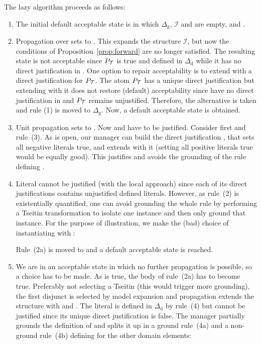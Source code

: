\documentclass[11pt]{article}
\newcommand{\m}[1]{\ensuremath{#1}\xspace}
\newcommand{\I}{\m{\mathcal{I}}}
\newcommand{\theory}{\m{\mathcal{T}}}
\newcommand{\D}{\m{\Delta}}
\theoremstyle{plain}
\theoremstyle{definition}
\theoremstyle{example_basic}
\theoremstyle{example_contd}
\theoremstyle{plain}
\newcommand{\Dg}{\ensuremath{\D_\text{g}}\xspace}
\newcommand{\Dd}{\ensuremath{\D_\text{d}}\xspace}
\newcommand{\pt}{\ensuremath{P_\text{\theory}}\xspace}
\newcommand{\change}[1]{#1}
\begin{document}
The lazy \MX algorithm proceeds as follows:
\begin{enumerate}
\item The initial default acceptable state is
   in which \Dg, \I and \jgraph are empty,
  and .

\item Propagation over  sets  to .
  \change{This expands the structure \I, but now the conditions of
    Proposition~\ref{prop:forward} are no longer satisfied. The
    resulting state is not acceptable since \pt is true and defined in
    \Dd while it has no direct justification in \jgraph.  One option
    to repair acceptability is to extend \jgraph with a direct
    justification for \pt.  The  atom \pt has a unique direct
    justification  but extending \jgraph with it does not
    restore (default) acceptability since  have no direct
    justification in \jgraph and  \pt remains unjustified. Therefore,
    the alternative is taken and rule (1) is moved to \Dg. Now, a default acceptable state is obtained.}

\item \change{Unit propagation sets  to . Now  and  have to be justified. Consider first  and rule~(3). As  is open, our manager can build the direct justification , that sets all negative  literals true, and extends \jgraph with it (setting all positive  literals true would be equally good). This justifies  and avoids the grounding of the rule defining .}

\item Literal  cannot be justified (with the local approach) since each of its direct justifications contains unjustified defined literals. However, as rule~(2) is existentially quantified, one can avoid grounding the whole rule by performing a Tseitin transformation to isolate one instance and then only ground that instance. For the purpose of illustration, we make the (bad) choice of  instantiating  with :
  
  Rule~(2a) is moved to  and a default acceptable state is reached.

\item We are in an acceptable state in which no further propagation is possible, so a choice has to be made. As  is true, the body of rule~(2a) has to become true. Preferably not selecting a Tseitin (this would trigger more grounding), the first disjunct is selected by model expansion and propagation extends the structure with  and . \change{The literal  is defined in \Dd by rule~(4) but cannot be justified since its unique direct justification  is false. The manager partially grounds the definition of  and splits it up in a ground rule~(4a) and a non-ground  rule~(4b) defining  for the other domain elements: }
  

\end{enumerate}
\end{document}
